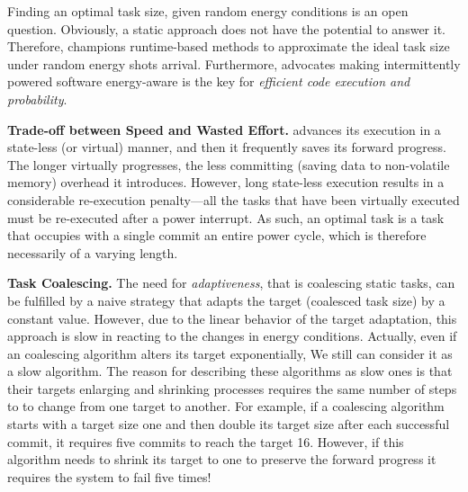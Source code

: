 
Finding an optimal task size, given random energy conditions is an open question. Obviously, a static approach does not have the potential to answer it. Therefore, \sys champions runtime-based methods to approximate the ideal task size under random energy shots arrival. Furthermore, \sys advocates making intermittently powered software energy-aware is the key for \emph{efficient code execution and probability}. 

\textbf{Trade-off between Speed and Wasted Effort.} \sys advances its execution in a state-less (or virtual) manner, and then it frequently saves its forward progress. The longer \sys virtually progresses, the less committing (saving data to non-volatile memory) overhead it introduces. However, long state-less execution results in a considerable re-execution penalty---all the tasks that have been virtually executed must be re-executed after a power interrupt. As such, an optimal task is a task that occupies with a single commit an entire power cycle, which is therefore necessarily of a varying length.  


\textbf{Task Coalescing.} 
The need for \emph{adaptiveness}, that is coalescing static tasks, can be fulfilled by a naive strategy that adapts the target (coalesced task size) by a constant value. However, due to the linear behavior of the target adaptation, this approach is slow in reacting to the changes in energy conditions. Actually, even if an coalescing algorithm alters its target exponentially, We still can consider it as a slow algorithm. The reason for describing these algorithms as slow ones is that their targets enlarging and shrinking processes requires the same number of steps to to change from one target to another. For example, if a coalescing algorithm starts with a target size one and then double its target size after each successful commit, it requires five commits to reach the target 16. However, if this algorithm needs to shrink its target to one to preserve the forward progress it requires the system to fail five times!

